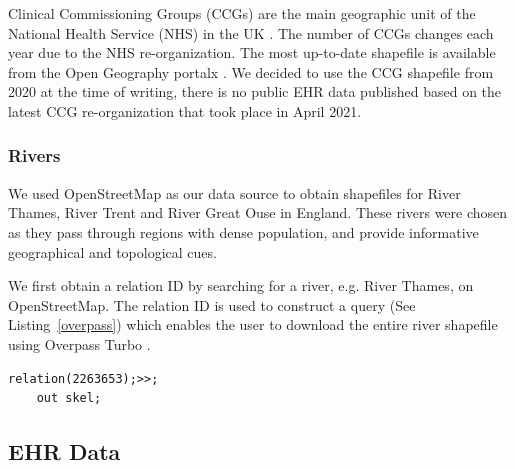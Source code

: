 Clinical Commissioning Groups (CCGs) are the main geographic unit of the National Health Service (NHS) in the UK \cite{nhsNHS}. The number of CCGs changes each year due to the NHS re-organization. The most up-to-date shapefile is available from the Open Geography portalx \cite{opengeographyportalxOpen}. We decided to use the CCG shapefile from 2020 at the time of writing, there is no public EHR data published based on the latest CCG re-organization that took place in April 2021.

\subsubsection{Rivers}

We used OpenStreetMap \cite{openstreetmapRelation} as our data source to obtain shapefiles for River Thames, River Trent and River Great Ouse in England. These rivers were chosen as they pass through regions with dense population, and provide informative geographical and topological cues. 

We first obtain a relation ID by searching for a river, e.g. River Thames, on OpenStreetMap. The relation ID is used to construct a query (See Listing~\ref{overpass}) which enables the user to download the entire river shapefile using Overpass Turbo \cite{overpassturboOverpass}.

\begin{lstlisting}[caption={The query that downloads the shapefile of River Thames from OpenStreetMap via the Overpass Turbo API.}, label={overpass},captionpos=b]
    relation(2263653);>>;
    out skel;
\end{lstlisting}

\subsection{EHR Data}

